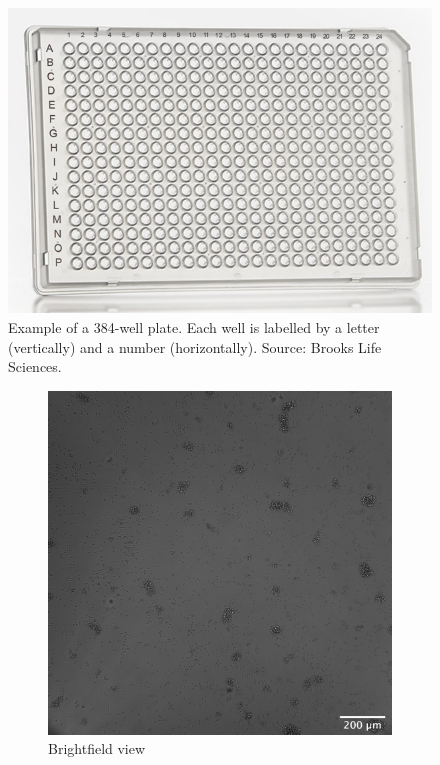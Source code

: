 \begin{figure}[h]
    \centering
    \includegraphics[width=.4\textwidth]{dissertation/figures/384_well.jpg}
    \caption{Example of a 384-well plate. Each well is labelled by a letter (vertically) and a number (horizontally). Source: Brooks Life Sciences.}
    \label{fig:384_well}
\end{figure}

\begin{figure}[h]
    \centering
    \begin{subfigure}[h!]{0.3\textwidth}
        \includegraphics[width=\textwidth]{dissertation/figures/example_Brightfield_L20.jpg}
        \caption{Brightfield view}
        \label{fig:fov_brightfield}
    \end{subfigure}
    \begin{subfigure}[h!]{0.3\textwidth}

\end{subfigure}
\end{figure}
